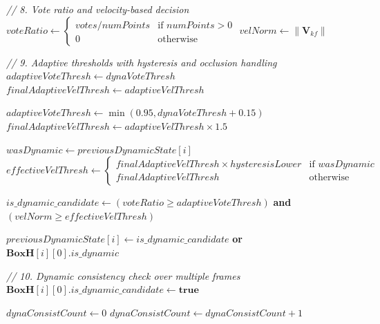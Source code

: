 \documentclass[14pt,a4paper]{article}
\begin{document}
\begin{algorithm}
\begin{algorithmic}[1]
    
    \State \textit{// 8. Vote ratio and velocity-based decision}
    \State $voteRatio \gets \begin{cases}
        votes / numPoints & \text{if } numPoints > 0 \\
        0 & \text{otherwise}
    \end{cases}$
    \State $velNorm \gets \|\mathbf{V}_{kf}\|$
    
    \State \textit{// 9. Adaptive thresholds with hysteresis and occlusion handling}
    \State $adaptiveVoteThresh \gets dynaVoteThresh$
    \State $finalAdaptiveVelThresh \gets adaptiveVelThresh$
    
        \State $adaptiveVoteThresh \gets \min(0.95, dynaVoteThresh + 0.15)$
        \State $finalAdaptiveVelThresh \gets adaptiveVelThresh \times 1.5$
    \EndIf
    
    \State $wasDynamic \gets previousDynamicState[i]$
    \State $effectiveVelThresh \gets \begin{cases}
        finalAdaptiveVelThresh \times hysteresisLower & \text{if } wasDynamic \\
        finalAdaptiveVelThresh & \text{otherwise}
    \end{cases}$
    
    \State $is\_dynamic\_candidate \gets (voteRatio \geq adaptiveVoteThresh)$ \textbf{and} 
                                      $(velNorm \geq effectiveVelThresh)$
    
    \State $previousDynamicState[i] \gets is\_dynamic\_candidate$ \textbf{or} $\mathbf{BoxH}[i][0].is\_dynamic$
    
    \State \textit{// 10. Dynamic consistency check over multiple frames}
        \State $\mathbf{BoxH}[i][0].is\_dynamic\_candidate \gets \textbf{true}$
        
        \State $dynaConsistCount \gets 0$
                    \State $dynaConsistCount \gets dynaConsistCount + 1$
                \EndIf
            \EndFor
        \EndIf
        

\end{algorithmic}
\end{algorithm}
\end{document}
